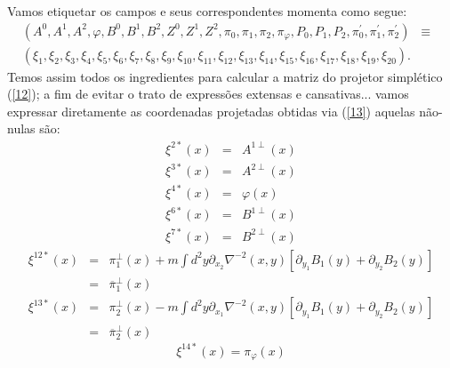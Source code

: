 \documentclass[a4paper,thmsa,12pt]{report}
\begin{document}
Vamos etiquetar os campos e seus correspondentes momenta como segue:
\begin{eqnarray}
\left( A^{0},A^{1},A^{2},\varphi ,B^{0},B^{1},B^{2},Z^{0},Z^{1},Z^{2},\pi
_{0},\pi _{1},\pi _{2},\pi _{\varphi },P_{0},P_{1},P_{2},\pi _{0}^{\prime
},\pi _{1}^{\prime },\pi _{2}^{\prime }\right) &\equiv &  \nonumber \\
\left( \xi _{1},\xi _{2},\xi _{3},\xi _{4},\xi _{5},\xi _{6},\xi _{7},\xi
_{8},\xi _{9},\xi _{10},\xi _{11},\xi _{12},\xi _{13},\xi _{14},\xi
_{15},\xi _{16},\xi _{17},\xi _{18},\xi _{19},\xi _{20}\right) . && 
\nonumber
\end{eqnarray}
Temos assim todos os ingredientes para calcular a matriz do projetor
simpl\'{e}tico (\ref{12}); a fim de evitar o trato de express\~{o}es
extensas e cansativas... vamos expressar diretamente as coordenadas
projetadas obtidas via (\ref{13}) aquelas n\~{a}o-nulas s\~{a}o: 
\begin{eqnarray}
\xi ^{2\ast }\left( x\right) &=& A^{1\perp }\left( x\right)  \label{360.a}
\\
\xi ^{3\ast }\left( x\right) &=& A^{2\perp }\left( x\right)  \label{360.b}
\\
\xi ^{4\ast }\left( x\right) &=& \varphi \left( x\right)  \label{360.c}
\\
\xi ^{6\ast }\left( x\right) &=& B^{1\perp }\left( x\right)  \label{360.d}
\\
\xi ^{7\ast }\left( x\right) &=& B^{2\perp }\left( x\right)  \label{360.e}
\end{eqnarray}
\begin{eqnarray}
\xi ^{12\ast }\left( x\right) &=&\pi _{1}^{\perp }\left( x\right) +m\int
d^{2}y\partial _{x_{2}}\nabla ^{-2}\left( x,y\right) \left[ \partial
_{y_{1}}B_{1}\left( y\right) +\partial _{y_{2}}B_{2}\left( y\right) \right] 
\nonumber \\
&=&\overline{\pi }_{1}^{\perp }\left( x\right)  \label{360.f}
\end{eqnarray}
\begin{eqnarray}
\xi ^{13\ast }\left( x\right) &=&\pi _{2}^{\perp }\left( x\right) -m\int
d^{2}y\partial _{x_{1}}\nabla ^{-2}\left( x,y\right) \left[ \partial
_{y_{1}}B_{1}\left( y\right) +\partial _{y_{2}}B_{2}\left( y\right) \right] 
\nonumber \\
&=&\overline{\pi }_{2}^{\perp }\left( x\right)  \label{360.g}
\end{eqnarray}
\begin{equation}
\xi ^{14\ast }\left( x\right) =\pi _{\varphi }\left( x\right)  \label{360.h}
\end{equation}
\end{document}

